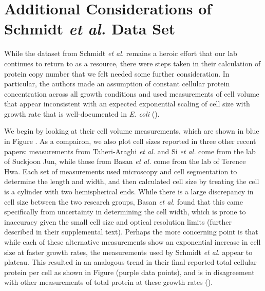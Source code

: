 \section{Additional Considerations of Schmidt \textit{et al.} Data Set}
\label{sec:SI_schmidt}

While the dataset from Schmidt \textit{et al.} remains a heroic effort that our
lab continues to return to as a resource, there were steps taken in their
calculation of protein copy number that we felt needed some further
consideration. In particular, the authors made an assumption of constant
cellular protein concentration across all growth conditions and used
measurements of cell volume that appear inconsistent with an expected
exponential scaling of cell size with growth rate that is well-documented in
\textit{E. coli} (\cite{schaechter1958, taheriaraghi2015, si2017}).

We begin by looking at their cell volume measurements, which are shown in blue
in Figure . As a compairon, we also plot cell
sizes reported in three other recent papers: measurements from Taheri-Araghi
\textit{et al.} and Si \textit{et al.} come from the lab of Suckjoon Jun, while
those from Basan \textit{et al.} come  from the lab of Terence Hwa.  Each set of
measurements used microscopy and cell segmentation to determine the length and
width, and then calculated cell size by treating the cell is a cylinder with two
hemispherical ends. While there is a large discrepancy in cell size between the
two research groups, Basan \textit{et al.} found that this came specifically
from uncertainty in determining the cell width, which is prone to inaccuracy
given the small cell size and optical resolution limits (further described in
their supplemental text). Perhaps the more concerning point is that while each
of these alternative measurements show an exponential increase in  cell size at
faster growth rates, the measurements used by Schmidt \textit{et al.} appear to
plateau. This resulted in an analogous trend in their final reported total
cellular protein per cell as shown in Figure
 (purple data points), and is in
disagreement with other measurements of total protein at these growth rates
(\cite{basan2015}).

